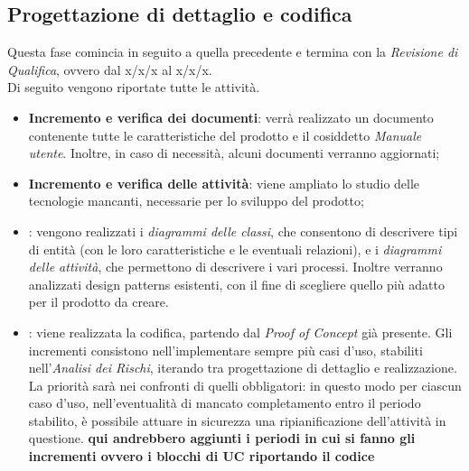 \subsection{Progettazione di dettaglio e codifica}
Questa fase comincia in seguito a quella precedente e termina con la \textit{Revisione di Qualifica}, ovvero dal x/x/x al x/x/x.\\
Di seguito vengono riportate tutte le attività.

\begin{itemize}
	\item \textbf{Incremento e verifica dei documenti}: verrà realizzato un documento contenente tutte le caratteristiche del prodotto e il cosiddetto \textit{Manuale utente}. Inoltre, in caso di necessità, alcuni documenti verranno aggiornati;
	\item \textbf{Incremento e verifica delle attività}: viene ampliato lo studio delle tecnologie mancanti, necessarie per lo sviluppo del prodotto; 
	\item \textbf{}: vengono realizzati i \textit{diagrammi delle classi}, che consentono di descrivere tipi di entità (con le loro caratteristiche e le eventuali relazioni), e i \textit{diagrammi delle attività}, che permettono di descrivere i vari processi. Inoltre verranno analizzati design patterns esistenti, con il fine di scegliere quello più adatto per il prodotto da creare.
	\item \textbf{}: viene realizzata la codifica, partendo dal \textit{Proof of Concept} già presente. Gli incrementi consistono nell'implementare sempre più casi d'uso, stabiliti nell'\textit{Analisi dei Rischi}, iterando tra progettazione di dettaglio e realizzazione. La priorità sarà nei confronti di quelli obbligatori: in questo modo per ciascun caso d'uso, nell'eventualità di mancato completamento entro il periodo stabilito, è possibile attuare in sicurezza una ripianificazione dell'attività in questione. \textbf{qui andrebbero aggiunti i periodi in cui si fanno gli incrementi ovvero i blocchi di UC riportando il codice}
\end{itemize}

